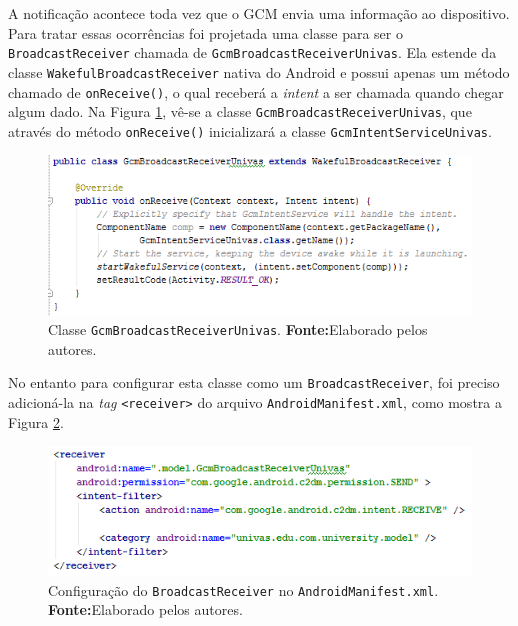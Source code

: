 	\pagebreak
	
	\par A notificação acontece toda vez que o GCM envia uma informação ao
dispositivo. Para tratar essas ocorrências foi projetada uma classe para ser o
\texttt{BroadcastReceiver} chamada de \texttt{GcmBroadcastReceiverUnivas}. Ela
estende da classe \texttt{WakefulBroadcastReceiver} nativa do Android e possui
apenas um método chamado de \texttt{onReceive()}, o qual receberá a
\textit{intent} a ser chamada quando chegar algum dado. Na Figura
\ref{fig:app14}, vê-se a classe \texttt{GcmBroadcastReceiverUnivas}, que
através do método \texttt{onReceive()} inicializará a classe
\texttt{GcmIntentServiceUnivas}.

		\begin{figure}[h!] 
			\centerline{\includegraphics[scale=0.8]{./imagens/2_q_metodologico/4_procedimentos_resultados/42_aplicativo/app14.png}}
			\caption[Classe GcmBroadcastReceiverUnivas]{Classe \texttt{GcmBroadcastReceiverUnivas}.
			\textbf{Fonte:}Elaborado pelos autores.}
			\label{fig:app14}
		\end{figure}
	
	\par No entanto para configurar esta classe como um \texttt{BroadcastReceiver},
foi preciso adicioná-la na \textit{tag} \texttt{<receiver>} do arquivo
\texttt{AndroidManifest.xml}, como mostra a Figura \ref{fig:app15}.

		\begin{figure}[h!] 
			\centerline{\includegraphics[scale=0.8]{./imagens/2_q_metodologico/4_procedimentos_resultados/42_aplicativo/app15.png}}
			\caption[Configuração do BroadcastReceiver no
			AndroidManifest.xml]{Configuração do \texttt{BroadcastReceiver} no
			\texttt{AndroidManifest.xml}.
			\textbf{Fonte:}Elaborado pelos autores.}
			\label{fig:app15}
		\end{figure}
	
